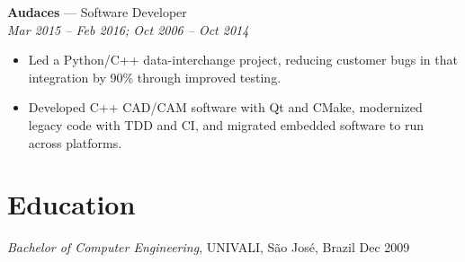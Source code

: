 \documentclass[line,margin]{res}
\begin{document}
\begin{resume}
\textbf{Audaces} --- Software Developer \\
{\sl Mar 2015 -- Feb 2016; Oct 2006 -- Oct 2014}
\begin{itemize} \itemsep -3pt
\item Led a Python/C++ data-interchange project, reducing customer bugs in that integration by 90\% through improved testing.
\item Developed C++ CAD/CAM software with Qt and CMake, modernized legacy code with TDD and CI, and migrated embedded software to run across platforms.
\end{itemize}

\section{Education}
{\sl Bachelor of Computer Engineering}, UNIVALI, S\~{a}o Jos\'{e}, Brazil \hfill Dec 2009

\end{resume}
\end{document}
